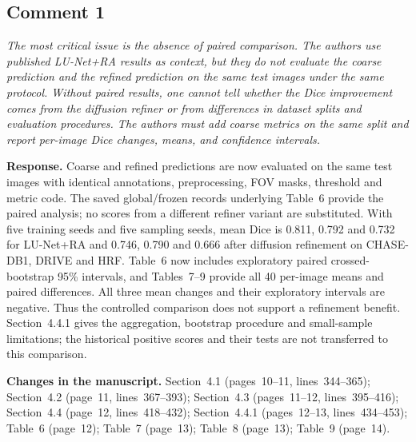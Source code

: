 \documentclass[11pt,a4paper]{article}
\newenvironment{revcomment}{\par\medskip\noindent\begin{minipage}{\linewidth}\itshape}{\end{minipage}\par\smallskip}
\begin{document}
\subsection*{Comment 1}
\begin{revcomment}The most critical issue is the absence of paired comparison. The authors use published LU-Net+RA results as context, but they do not evaluate the coarse prediction and the refined prediction on the same test images under the same protocol. Without paired results, one cannot tell whether the Dice improvement comes from the diffusion refiner or from differences in dataset splits and evaluation procedures. The authors must add coarse metrics on the same split and report per-image Dice changes, means, and confidence intervals.\end{revcomment}
\textbf{Response.} Coarse and refined predictions are now evaluated on the same test images with identical annotations, preprocessing, FOV masks, threshold and metric code. The saved global/frozen records underlying Table~6 provide the paired analysis; no scores from a different refiner variant are substituted. With five training seeds and five sampling seeds, mean Dice is 0.811, 0.792 and 0.732 for LU-Net+RA and 0.746, 0.790 and 0.666 after diffusion refinement on CHASE-DB1, DRIVE and HRF. Table~6 now includes exploratory paired crossed-bootstrap 95\% intervals, and Tables~7--9 provide all 40 per-image means and paired differences. All three mean changes and their exploratory intervals are negative. Thus the controlled comparison does not support a refinement benefit. Section~4.4.1 gives the aggregation, bootstrap procedure and small-sample limitations; the historical positive scores and their tests are not transferred to this comparison.

\textbf{Changes in the manuscript.} Section~4.1 (pages~10--11, lines~344--365); Section~4.2 (page~11, lines~367--393); Section~4.3 (pages~11--12, lines~395--416); Section~4.4 (page~12, lines~418--432); Section~4.4.1 (pages~12--13, lines~434--453); Table~6 (page~12); Table~7 (page~13); Table~8 (page~13); Table~9 (page~14).
\end{document}
